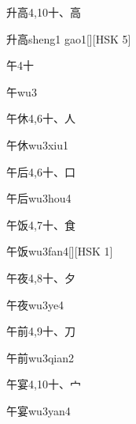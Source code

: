 \begin{entry}{升高}{4,10}{⼗、⾼}
  \begin{phonetics}{升高}{sheng1 gao1}[][HSK 5]
  \end{phonetics}
\end{entry}

\begin{entry}{午}{4}{⼗}
  \begin{phonetics}{午}{wu3}
  \end{phonetics}
\end{entry}

\begin{entry}{午休}{4,6}{⼗、⼈}
  \begin{phonetics}{午休}{wu3xiu1}
  \end{phonetics}
\end{entry}

\begin{entry}{午后}{4,6}{⼗、⼝}
  \begin{phonetics}{午后}{wu3hou4}
  \end{phonetics}
\end{entry}

\begin{entry}{午饭}{4,7}{⼗、⾷}
  \begin{phonetics}{午饭}{wu3fan4}[][HSK 1]
  \end{phonetics}
\end{entry}

\begin{entry}{午夜}{4,8}{⼗、⼣}
  \begin{phonetics}{午夜}{wu3ye4}
  \end{phonetics}
\end{entry}

\begin{entry}{午前}{4,9}{⼗、⼑}
  \begin{phonetics}{午前}{wu3qian2}
  \end{phonetics}
\end{entry}

\begin{entry}{午宴}{4,10}{⼗、⼧}
  \begin{phonetics}{午宴}{wu3yan4}
  \end{phonetics}
\end{entry}

